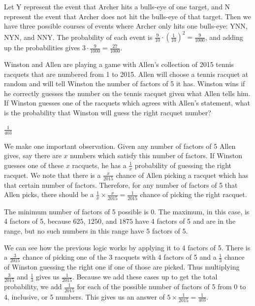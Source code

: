 \documentclass[11pt]{article}
\begin{document}
\begin{solution}
Let Y represent the event that Archer hits a bulls-eye of one target, and N represent the event that Archer does not hit the bulls-eye of that target. Then we have three possible courses of events where Archer only hits one bulls-eye: YNN, NYN, and NNY. The probability of each event is $\frac{9}{10}\cdot(\frac{1}{10})^2 = \frac{9}{1000}$, and adding up the probabilities gives $3\cdot\frac{9}{1000} = \boxed{\frac{27}{1000}}$.
\end{solution}

\begin{problem} Winston and Allen are playing a game with Allen's collection of 2015 tennis racquets that are numbered from 1 to 2015. Allen will choose a tennis racquet at random and will tell Winston the number of factors of 5 it has. Winston wins if he correctly guesses the number on the tennis racquet given what Allen tells him. If Winston guesses one of the racquets which agrees with Allen's statement, what is the probability that Winston will guess the right racquet number? 
\end{problem}
\begin{answer}
$\boxed{\frac{1}{403}}$
\end{answer}
\begin{solution} We make one important observation. Given any number of factors of 5 Allen gives, say there are $x$ numbers which satisfy this number of factors. If Winston guesses one of these $x$ racquets, he has a $\frac{1}{x}$ probability of guessing the right racquet. We note that there is a $\frac{x}{2015}$ chance of Allen picking a racquet which has that certain number of factors. Therefore, for any number of factors of 5 that Allen picks, there should be a $\frac{1}{x} \times \frac{x}{2015} = \frac{1}{2015}$ chance of picking the right racquet. 

The minimum number of factors of 5 possible is 0. The maximum, in this case, is 4 factors of 5, because $625$, $1250$, and $1875$ have 4 factors of 5 and are in the range, but no such numbers in this range have 5 factors of 5.

We can see how the previous logic works by applying it to 4 factors of 5. There is a $\frac{3}{2015}$ chance of picking one of the 3 racquets with 4 factors of 5 and a $\frac{1}{3}$ chance of Winston guessing the right one if one of those are picked. Thus multiplying $\frac{3}{2015}$ and $\frac{1}{3}$ gives us $\frac{1}{2015}$. Because we add these cases up to get the total probability, we add $\frac{1}{2015}$ for each of the possible number of factors of 5 from 0 to 4, inclusive, or 5 numbers. This gives us an answer of $5 \times \frac{1}{2015} = \boxed{\frac{1}{403}}$.
\end{solution}
\end{document}
